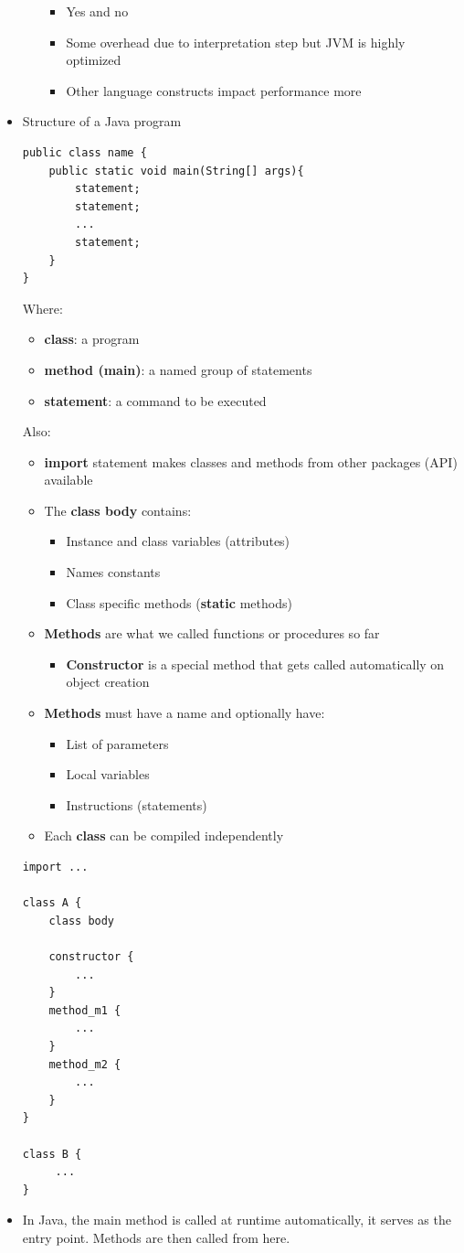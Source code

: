\documentclass[a4paper]{article}
\begin{document}
\begin{itemize}
\begin{itemize}
\begin{itemize}
\item Yes and no
\item Some overhead due to interpretation step but JVM is highly optimized
\item Other language constructs impact performance more
\end{itemize}
\end{itemize}
\item Structure of a Java program
\begin{lstlisting}
public class name {
	public static void main(String[] args){
		statement;
		statement;
		...
		statement;
	}
}
\end{lstlisting}
Where:
\begin{itemize}
\item \textbf{class}: a program
\item\textbf{method (main)}: a named group of statements
\item \textbf{statement}: a command to be executed
\end{itemize}
Also:
\begin{itemize}
\item \textbf{import} statement makes classes and methods from other packages (API) available
\item The \textbf{class body} contains:
\begin{itemize}
\item Instance and class variables (attributes)
\item Names constants
\item Class specific methods (\textbf{static} methods)
\end{itemize}
\item \textbf{Methods} are what we called functions or procedures so far
\begin{itemize}
\item \textbf{Constructor} is a special method that gets called automatically on object creation
\end{itemize}
\item \textbf{Methods} must have a name and optionally have:
\begin{itemize}
\item List of parameters
\item Local variables
\item Instructions (statements)
\end{itemize}
\item Each \textbf{class} can be compiled independently 
\end{itemize}

\begin{lstlisting}
import ...

class A {
	class body
	
	constructor {
	    ...
	}
	method_m1 {
	    ...
	}
	method_m2 {
	    ...
	}
}	

class B {
     ...
}
\end{lstlisting}
\item In Java, the main method is called at runtime automatically, it serves as the entry point. Methods are then called from here.
\end{itemize}
\end{document}
